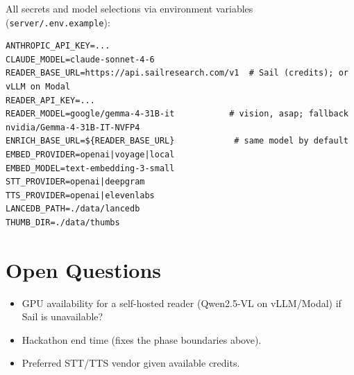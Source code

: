 \documentclass[11pt,a4paper]{article}
\begin{document}
All secrets and model selections via environment variables (\texttt{server/.env.example}):
\begin{lstlisting}
ANTHROPIC_API_KEY=...
CLAUDE_MODEL=claude-sonnet-4-6
READER_BASE_URL=https://api.sailresearch.com/v1  # Sail (credits); or vLLM on Modal
READER_API_KEY=...
READER_MODEL=google/gemma-4-31B-it           # vision, asap; fallback nvidia/Gemma-4-31B-IT-NVFP4
ENRICH_BASE_URL=${READER_BASE_URL}            # same model by default
EMBED_PROVIDER=openai|voyage|local
EMBED_MODEL=text-embedding-3-small
STT_PROVIDER=openai|deepgram
TTS_PROVIDER=openai|elevenlabs
LANCEDB_PATH=./data/lancedb
THUMB_DIR=./data/thumbs
\end{lstlisting}

\section{Open Questions}
\begin{itemize}
  \item GPU availability for a self-hosted reader (Qwen2.5-VL on vLLM/Modal) if Sail is unavailable?
  \item Hackathon end time (fixes the phase boundaries above).
  \item Preferred STT/TTS vendor given available credits.
\end{itemize}
\end{document}
